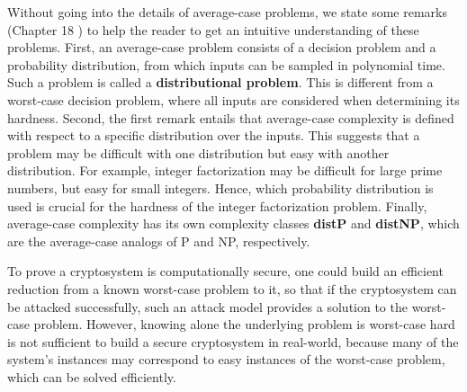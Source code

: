\documentclass[../main.tex]{subfiles}
\begin{document}
Without going into the details of average-case problems, we state some remarks (Chapter 18  \citep{arora2009computational}) to help the reader to get an intuitive understanding of these problems. First, an average-case problem consists of a decision problem and a probability distribution, from which inputs can be sampled in polynomial time. Such a problem is called a \textbf{distributional problem}. This is different from a worst-case decision problem, where all inputs are considered when determining its hardness. Second, the first remark entails that average-case complexity is defined with respect to a specific distribution over the inputs. This suggests that a problem may be difficult with one distribution but easy with another distribution. For example, integer factorization may be difficult for large prime numbers, but easy for small integers. Hence, which probability distribution is used is crucial for the hardness of the integer factorization problem. Finally, average-case complexity has its own complexity classes \textbf{distP} and \textbf{distNP}, which are the average-case analogs of P and NP, respectively. 

To prove a cryptosystem is computationally secure, one could build an efficient reduction from a known worst-case problem to it, so that if the cryptosystem can be attacked successfully, such an attack model provides a solution to the worst-case problem. However, knowing alone the underlying problem is worst-case hard is not sufficient to build a secure cryptosystem in real-world, because many of the system's instances may correspond to easy instances of the worst-case problem, which can be solved efficiently. 
\end{document}
